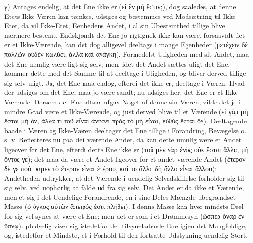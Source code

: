 \documentclass[12pt]{book}
\newcommand{\opage}[1]{\marginnote{\footnotesize\textit{[#1]}}}
\begin{document}
γ) Antages endelig, at det Ene ikke er (εἰ ἓν μὴ ἔστιν;), dog saaledes, at denne Etets Ikke-Væren
kan tænkes, udsiges og bestemmes ved Modsætning til Ikke-Etet, da vil
\opage{133} Ikke-Etet, Eenhedens Andet, i al sin Ubestemthed tillige blive nærmere bestemt. Endskjøndt det
Ene jo rigtignok ikke kan være, forsaavidt det er et Ikke-Værende, kan det dog alligevel deeltage
i mange Egenheder (μετέχειν δὲ πολλῶν οὐδὲν κωλύει, ἀλλὰ καὶ ἀνάγκη). Formedelst Uligheden med sit
Andet, maa det Ene nemlig være ligt sig selv; men, idet det Andet sættes uligt det Ene, kommer
dette med det Samme til at deeltage i Uligheden, og bliver derved tillige sig selv uligt. Ja, det
Ene maa endog, efterdi det ikke er, deeltage i Væren. Hvad der udsiges om det Ene, maa jo være
sandt; nu udsiges her: det Ene er et Ikke-Værende. Dersom det Ene altsaa afgav Noget af denne sin
Væren, vilde det jo i mindre Grad være et Ikke-Værende, og just derved blive til et Værende (εἰ
γὰρ μὴ ἔσται μὴ ὄν, ἀλλά τι τοῦ εἶναι ἀνήσει πρὸς τὸ μὴ εἶναι, εὐθὺς ἔσται ὄν). Deeltagende baade i
Væren og Ikke-Væren deeltager det Ene tillige i Forandring, Bevægelse o. s. v. Reflecteres nu paa
det værende Andet, da kan dette umulig være et Andet ligeover for det Ene, efterdi dette Ene ikke
er (τοῦ μὲν γὰρ ἑνὸς οὐκ ἔσται ἄλλα, μὴ ὄντος γε); det maa da være et Andet ligeover for et andet
værende Andet (ἕτερον δὲ γὲ πού φαμεν τὸ ἕτερον εἶναι ἑτέρου, καὶ τὸ ἄλλο δὴ ἄλλο εἶναι ἄλλου):
Andetheden udtrykker, at det Værende i uendelig Selvadskillelse forholder sig til sig selv, ved
uophørlig at falde ud fra sig selv. Det Andet er da ikke et Værende, men et sig i det Uendelige
Forandrende, en i sine Deles Mængde ubegrændset Masse (ὁ ὄγκος αὐτῶν ἄπειρός ἐστι πλήθει). I denne
Masse kan hver mindste Deel for sig vel synes at være et Ene; men det er som i et Drømmesyn
(ὥσπερ ὄναρ ἐν ὕπνῳ): pludselig viser sig istedetfor det tilsyneladende Ene igjen det Mangfoldige,
og, istedetfor et Mindste, et i Forhold til den fortsatte Udstykning uendelig Stort.
\end{document}
